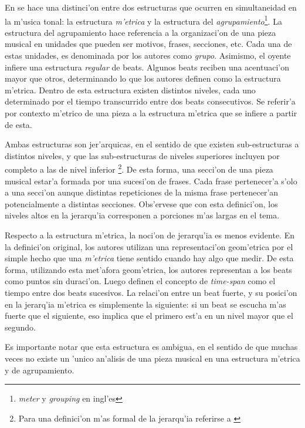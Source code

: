 En \citet*{LerdahlJackendoff83} se hace una distinci'on entre dos estructuras que ocurren en simultaneidad en la m'usica tonal:
la estructura \emph{m'etrica} y la estructura del \emph{agrupamiento}\footnote{\emph{meter} y \emph{grouping} en ingl'es}. 
La estructura del agrupamiento hace referencia a la organizaci'on de una pieza musical en unidades que pueden ser motivos, frases, secciones, etc. 
Cada una de estas unidades, es denominada por los autores como \emph{grupo}. Asimismo, el oyente infiere una estructura \emph{regular} de beats. 
Algunos beats reciben una acentuaci'on mayor que otros, determinando lo que los autores definen como la estructura m'etrica. Dentro de esta estructura
existen distintos niveles, cada uno determinado por el tiempo transcurrido entre dos beats consecutivos. 
Se referir'a por contexto m'etrico de una pieza a la estructura m'etrica que se infiere a partir de esta.

Ambas estructuras son jer'arquicas, en el sentido de que existen sub-estructuras a distintos niveles, y que las sub-estructuras de niveles superiores 
incluyen por completo a las de nivel inferior
\footnote{Para una definici'on m'as formal de la jerarqu'ia referirse a \citet[cap. ~2]{LerdahlJackendoff83}}. De esta forma, una secci'on
de una pieza musical estar'a formada por una sucesi'on de frases. Cada frase pertenecer'a s'olo a una secci'on aunque distintas repeticiones de la misma
frase pertenecer'an potencialmente a distintas secciones. Obs'ervese que con esta definici'on, los niveles altos en la jerarqu'ia corresponen a 
porciones m'as largas en el tema. 

Respecto a la estructura m'etrica, la noci'on de jerarqu'ia es menos evidente. En la definici'on original, los autores utilizan una representaci'on geom'etrica
por el simple hecho que una \emph{m'etrica} tiene sentido cuando hay algo que medir. De esta forma, utilizando esta met'afora geom'etrica, los autores representan 
a los beats como puntos sin duraci'on. Luego definen el concepto de \emph{time-span} como el tiempo entre dos beats sucesivos. 
La relaci'on entre un beat fuerte, y su posici'on en la jerarq'ia m'etrica es simplemente la siguiente: si un beat se escucha m'as fuerte que el siguiente, eso implica
que el primero est'a en un nivel mayor que el segundo.

%
%
%
Es importante notar que esta estructura es ambigua, en el sentido de que muchas veces no existe un 'unico an'alisis de una pieza musical 
en una estructura m'etrica y de agrupamiento.

